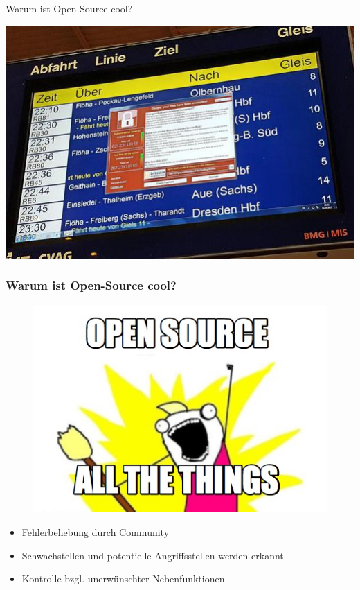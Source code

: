 \begin{frame}
	\Huge Warum ist Open-Source cool?
\end{frame}

\begin{frame}
	\centering\includegraphics[scale=1.7]{resources/wannacrydb.jpg}
\end{frame}

\begin{frame}
\frametitle{Warum ist Open-Source cool?}
\begin{figure}
\includegraphics[scale=0.4]{resources/att.jpg}
\end{figure}
\begin{itemize}
	\item Fehlerbehebung durch Community
	\item Schwachstellen und potentielle Angriffsstellen werden erkannt
	\item Kontrolle bzgl. unerwünschter Nebenfunktionen
\end{itemize}
\end{frame}


